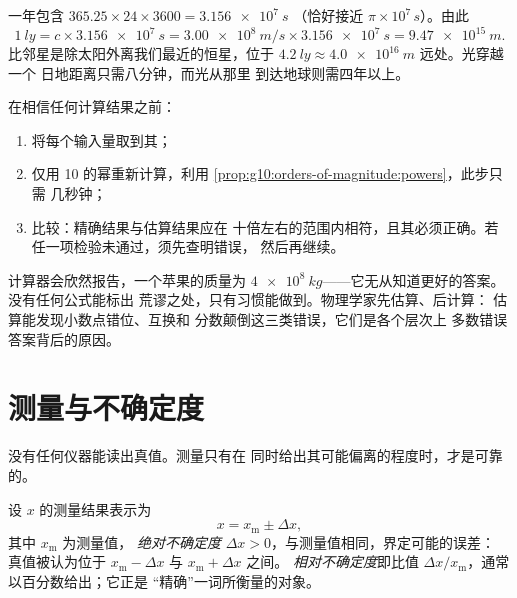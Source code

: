 \begin{example}[光年的米数]\label{ex:g10:orders-of-magnitude:ly}
一年包含 $365.25 \times 24 \times 3600 = \qty{3.156e7}{s}$
（恰好接近 $\pi \times 10^{7}\,\unit{s}$）。由此
\[
\qty{1}{ly} = c \times \qty{3.156e7}{s}
= \qty{3.00e8}{m/s} \times \qty{3.156e7}{s}
= \qty{9.47e15}{m}.
\]
比邻星是除太阳外离我们最近的恒星，位于
$\qty{4.2}{ly} \approx \qty{4.0e16}{m}$ 远处。光穿越一个
日地距离只需八分钟，而光从那里
到达地球则需四年以上。
\end{example}

\begin{method}[数量级的合理性检验]\label{met:g10:orders-of-magnitude:sanity}
在相信任何计算结果之前：
\begin{enumerate}
  \item 将每个输入量取到其；
  \item 仅用 10 的幂重新计算，利用
        \cref{prop:g10:orders-of-magnitude:powers}，此步只需
        几秒钟；
  \item 比较：精确结果与估算结果应在
        十倍左右的范围内相符，且其必须正确。若
        任一项检验未通过，须先查明错误，
        然后再继续。
\end{enumerate}
\end{method}

\begin{remark}[何必费心]\label{rem:g10:orders-of-magnitude:sanity}
计算器会欣然报告，一个苹果的质量为
$\qty{4e8}{kg}$——它无从知道更好的答案。没有任何公式能标出
荒谬之处，只有习惯能做到。物理学家先估算、后计算：
估算能发现小数点错位、互换和
分数颠倒这三类错误，它们是各个层次上
多数错误答案背后的原因。
\end{remark}

\section{测量与不确定度}

没有任何仪器能读出真值。测量只有在
同时给出其可能偏离的程度时，才是可靠的。

\begin{definition}[绝对与相对不确定度]\label{def:g10:orders-of-magnitude:uncertainty}
设 $x$ 的测量结果表示为
\[
x = x_{\text{m}} \pm \Delta x ,
\]
其中 $x_{\text{m}}$ 为测量值，
\emph{绝对不确定度} $\Delta x > 0$，与测量值相同，界定可能的误差：
真值被认为位于
$x_{\text{m}} - \Delta x$ 与 $x_{\text{m}} + \Delta x$ 之间。
\emph{相对不确定度}即比值
$\Delta x / x_{\text{m}}$，通常以百分数给出；它正是
“精确”一词所衡量的对象。
\end{definition}

